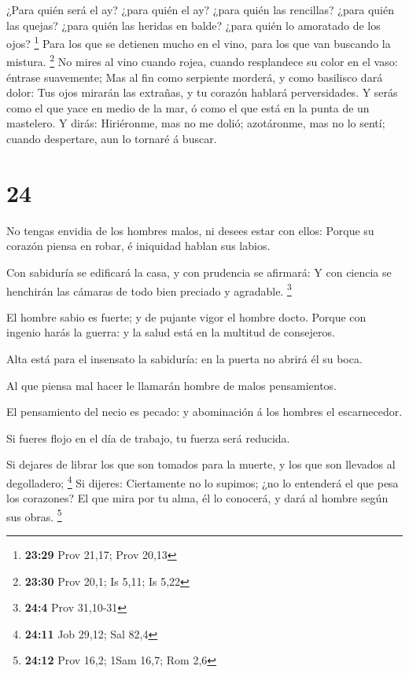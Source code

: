  ¿Para quién será el ay? ¿para quién el ay? ¿para quién las
rencillas? ¿para quién las quejas? ¿para quién las heridas en balde?
¿para quién lo amoratado de los ojos? \footnote{\textbf{23:29} Prov
  21,17; Prov 20,13}  Para los que se detienen mucho en el
vino, para los que van buscando la mistura. \footnote{\textbf{23:30}
  Prov 20,1; Is 5,11; Is 5,22}  No mires al vino cuando
rojea, cuando resplandece su color en el vaso: éntrase suavemente;
 Mas al fin como serpiente morderá, y como basilisco dará
dolor:  Tus ojos mirarán las extrañas, y tu corazón hablará
perversidades.  Y serás como el que yace en medio de la
mar, ó como el que está en la punta de un mastelero.  Y
dirás: Hiriéronme, mas no me dolió; azotáronme, mas no lo sentí; cuando
despertare, aun lo tornaré á buscar.

\hypertarget{section-23}{%
\section{24}\label{section-23}}

 No tengas envidia de los hombres malos, ni desees estar con
ellos:  Porque su corazón piensa en robar, é iniquidad
hablan sus labios.

 Con sabiduría se edificará la casa, y con prudencia se
afirmará:  Y con ciencia se henchirán las cámaras de todo
bien preciado y agradable. \footnote{\textbf{24:4} Prov 31,10-31}

 El hombre sabio es fuerte; y de pujante vigor el hombre
docto.  Porque con ingenio harás la guerra: y la salud está
en la multitud de consejeros.

 Alta está para el insensato la sabiduría: en la puerta no
abrirá él su boca.

 Al que piensa mal hacer le llamarán hombre de malos
pensamientos.

 El pensamiento del necio es pecado: y abominación á los
hombres el escarnecedor.

 Si fueres flojo en el día de trabajo, tu fuerza será
reducida.

 Si dejares de librar los que son tomados para la muerte, y
los que son llevados al degolladero; \footnote{\textbf{24:11} Job 29,12;
  Sal 82,4}  Si dijeres: Ciertamente no lo supimos; ¿no lo
entenderá el que pesa los corazones? El que mira por tu alma, él lo
conocerá, y dará al hombre según sus obras. \footnote{\textbf{24:12}
  Prov 16,2; 1Sam 16,7; Rom 2,6}

